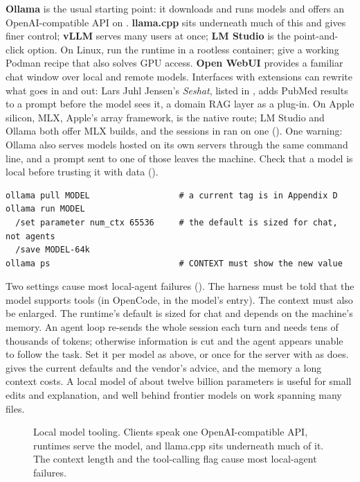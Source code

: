 \textbf{Ollama} is the usual starting point: it downloads and runs models and
offers an OpenAI-compatible API on . \textbf{llama.cpp}
sits underneath much of this and gives finer control; \textbf{vLLM} serves many
users at once; \textbf{LM Studio} is the point-and-click option. On Linux, run
the runtime in a rootless container; \textcite{monshed2026ollamapodman} give a
working Podman recipe that also solves GPU access. \textbf{Open WebUI} provides
a familiar chat window over local and remote models. Interfaces with extensions
can rewrite what goes in and out: Lars Juhl Jensen's \emph{Seshat}, listed in
, adds PubMed results to a prompt before the model sees
it, a domain RAG layer as a plug-in. On Apple silicon, MLX, Apple's array
framework, is the native route; LM Studio and Ollama both offer MLX builds,
and the sessions in  ran on one ().
One warning: Ollama also serves models hosted on its own servers through the
same command line, and a prompt sent to one of those leaves the machine.
Check that a model is local before trusting it with data
().

\begin{lstlisting}[style=shell,caption={A local coding model with a usable context}]
ollama pull MODEL                  # a current tag is in Appendix D
ollama run MODEL
  /set parameter num_ctx 65536     # the default is sized for chat, not agents
  /save MODEL-64k
ollama ps                          # CONTEXT must show the new value
\end{lstlisting}

Two settings cause most local-agent failures (). The harness must be told that
the model supports tools (in OpenCode,  in the model's
entry). The context must also be enlarged. The runtime's default is sized for
chat and depends on the machine's memory. An agent loop re-sends the whole
session each turn and needs tens of thousands of tokens; otherwise information
is cut and the agent appears unable to follow the task. Set it per model as
above, or
once for the server with  as
 does.  gives the current defaults
and the vendor's advice, and  the memory a long context
costs. A local model of about twelve billion parameters is useful for small
edits and explanation, and well behind frontier models on work spanning many
files.

\begin{figure}[htbp]
\centering
{}
\caption{Local model tooling. Clients speak one OpenAI-compatible API, runtimes
serve the model, and llama.cpp sits underneath much of it. The context length
and the tool-calling flag cause most local-agent failures.}
\label{fig:localtooling}
\end{figure}

